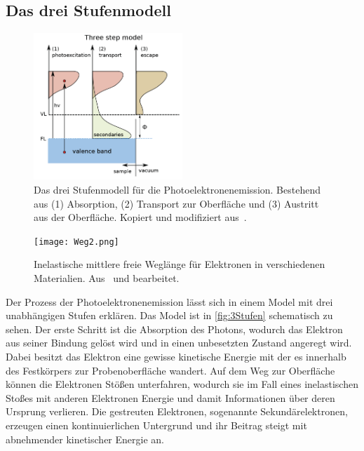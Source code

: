         \subsection{Das drei Stufenmodell} \label{sec:3Stufen}
            \begin{figure}
                \centering
                \includegraphics[width=0.5\textwidth]{3Stufen}
                \caption{Das drei Stufenmodell für die Photoelektronenemission.
                Bestehend aus (1) Absorption, (2) Transport zur Oberfläche und (3) Austritt aus der Oberfläche.
                Kopiert und modifiziert aus~\cite{zhang_synchrotron_2018}.}
                \label{fig:3Stufen}
            \end{figure}
            \begin{figure}
                \centering
                \texttt{[image: Weg2.png]}
                \caption{Inelastische mittlere freie Weglänge für Elektronen in verschiedenen Materialien. Aus~\cite{Hüfner} und bearbeitet.}
                \label{fig:Weg}
            \end{figure}
            Der Prozess der Photoelektronenemission lässt sich in einem Model mit drei unabhängigen Stufen erklären.
            Das Model ist in \autoref{fig:3Stufen} schematisch zu sehen.
            Der erste Schritt ist die Absorption des Photons, wodurch das Elektron aus seiner Bindung gelöst wird und in einen unbesetzten Zustand angeregt wird.
            Dabei besitzt das Elektron eine gewisse kinetische Energie mit der es innerhalb des Festkörpers zur Probenoberfläche wandert.
            Auf dem Weg zur Oberfläche können die Elektronen Stößen unterfahren, wodurch sie im Fall eines inelastischen Stoßes mit anderen Elektronen Energie und damit Informationen über deren Ursprung verlieren.
            Die gestreuten Elektronen, sogenannte Sekundärelektronen, erzeugen einen kontinuierlichen Untergrund und ihr Beitrag steigt mit abnehmender kinetischer Energie an.
